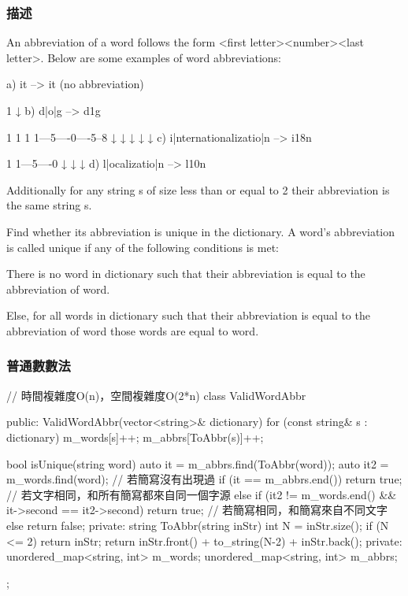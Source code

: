 \subsubsection{描述}
An abbreviation of a word follows the form <first letter><number><last letter>. Below are some examples of word abbreviations:

\begin{Code}
a) it                      --> it    (no abbreviation)

     1
     ↓
b) d|o|g                   --> d1g

              1    1  1
     1---5----0----5--8
     ↓   ↓    ↓    ↓  ↓    
c) i|nternationalizatio|n  --> i18n

              1
     1---5----0
     ↓   ↓    ↓
d) l|ocalizatio|n          --> l10n

Additionally for any string s of size less than or equal to 2 their abbreviation is the same string s.
\end{Code}

Find whether its abbreviation is unique in the dictionary. A word's abbreviation is called unique if any of the following conditions is met:

\begindot
\item There is no word in dictionary such that their abbreviation is equal to the abbreviation of word.
\item Else, for all words in dictionary such that their abbreviation is equal to the abbreviation of word those words are equal to word.
\myenddot

\subsubsection{普通數數法}
\begin{Code}
// 時間複雜度O(n)，空間複雜度O(2*n)
class ValidWordAbbr {
public:
    ValidWordAbbr(vector<string>& dictionary) {
        for (const string& s : dictionary)
        {
            m_words[s]++;
            m_abbrs[ToAbbr(s)]++;
        }
    }

    bool isUnique(string word) {
        auto it = m_abbrs.find(ToAbbr(word));
        auto it2 = m_words.find(word);
        // 若簡寫沒有出現過
        if (it == m_abbrs.end()) return true;
        // 若文字相同，和所有簡寫都來自同一個字源
        else if (it2 != m_words.end() && it->second == it2->second) return true;
        // 若簡寫相同，和簡寫來自不同文字
        else return false;
    }
private:
    string ToAbbr(string inStr)
    {
        int N = inStr.size();
        if (N <= 2) return inStr;
        return inStr.front() + to_string(N-2) + inStr.back();
    }
private:
    unordered_map<string, int> m_words;
    unordered_map<string, int> m_abbrs;
};
\end{Code}

